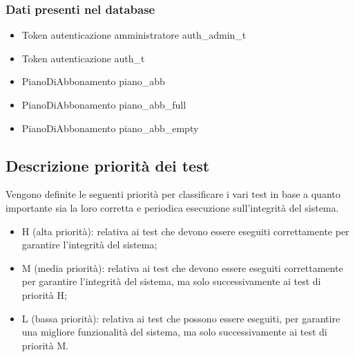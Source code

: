 \subsubsection*{Dati presenti nel database}
\begin{itemize}
    \item Token autenticazione amministratore auth\_admin\_t
    \item Token autenticazione auth\_t
    \item PianoDiAbbonamento piano\_abb
    \item PianoDiAbbonamento piano\_abb\_full
    \item PianoDiAbbonamento piano\_abb\_empty
    

\end{itemize}

\subsection*{Descrizione priorità dei test}

Vengono definite le seguenti priorità per classificare i vari test in base a quanto importante sia la 
loro corretta e periodica esecuzione sull'integrità del sistema.
\begin{itemize}
    \item H (alta priorità): relativa ai test che devono essere eseguiti correttamente per garantire l'integrità
    del sistema;
    \item M (media priorità): relativa ai test che devono essere eseguiti correttamente per garantire l'integrità
    del sistema, ma solo successivamente ai test di priorità H;
    \item L (bassa priorità): relativa ai test che possono essere eseguiti, per garantire una migliore funzionalità
    del sistema, ma solo successivamente ai test di priorità M.
\end{itemize}


